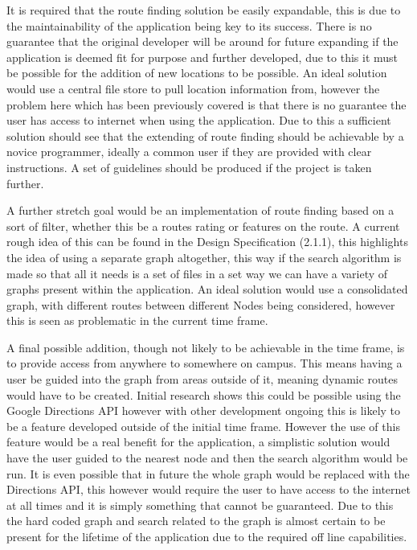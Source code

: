 It is required that the route finding solution be easily expandable, this is due to the maintainability of the application being key to its success. There is no guarantee that the original developer will be around for future expanding if the application is deemed fit for purpose and further developed, due to this it must be possible for the addition of new locations to be possible. An ideal solution would use a central file store to pull location information from, however the problem here which has been previously covered is that there is no guarantee the user has access to internet when using the application. Due to this a sufficient solution should see that the extending of route finding should be achievable by a novice programmer, ideally a common user if they are provided with clear instructions. A set of guidelines should be produced if the project is taken further. 

A further stretch goal would be an implementation of route finding based on a sort of filter, whether this be a routes rating or features on the route. A current rough idea of this can be found in the Design Specification (2.1.1), this highlights the idea of using a separate graph altogether, this way if the search algorithm is made so that all it needs is a set of files in a set way we can have a variety of graphs present within the application. An ideal solution would use a consolidated graph, with different routes between different Nodes being considered, however this is seen as problematic in the current time frame. 

A final possible addition, though not likely to be achievable in the time frame, is to provide access from anywhere to somewhere on campus. This means having a user be guided into the graph from areas outside of it, meaning dynamic routes would have to be created. Initial research shows this could be possible using the Google Directions API\cite{directions} however with other development ongoing this is likely to be a feature developed outside of the initial time frame. However the use of this feature would be a real benefit for the application, a simplistic solution would have the user guided to the nearest node and then the search algorithm would be run. It is even possible that in future the whole graph would be replaced with the Directions API, this however would require the user to have access to the internet at all times and it is simply something that cannot be guaranteed. Due to this the hard coded graph and search related to the graph is almost certain to be present for the lifetime of the application due to the required off line capabilities. 
